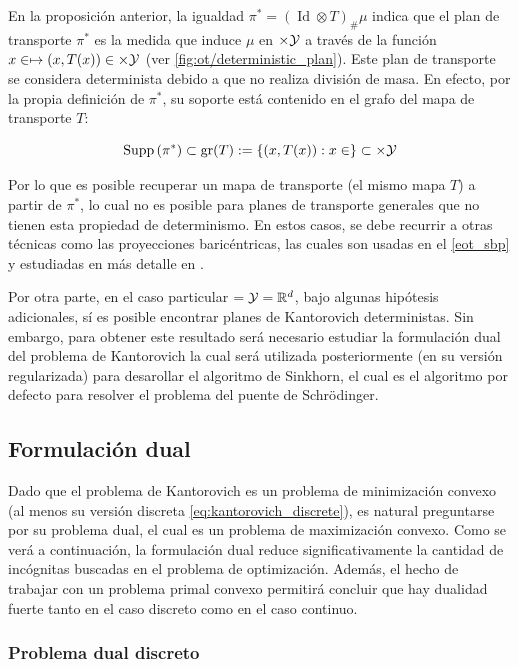 En la proposición anterior, la igualdad $\pi^* = (\operatorname{Id}\otimes T)_\#\mu$ indica que el plan de transporte $\pi^*$ es la medida que induce $\mu$ en $\times\mathcal{Y}$ a través de la función $x\in\mapsto (x,T(x))\in\times\mathcal{Y}$ (ver \autoref{fig:ot/deterministic_plan}). Este plan de transporte se considera determinista debido a que no realiza división de masa. En efecto, por la propia definición de $\pi^*$, su soporte está contenido en el grafo del mapa de transporte $T$:

\begin{equation*}
	\operatorname{Supp}\left(\pi^*\right)
	\subset \operatorname{gr}(T) := \{(x,T(x)) : x\in\}
	\subset \times\mathcal{Y}
\end{equation*}

Por lo que es posible recuperar un mapa de transporte (el mismo mapa $T$) a partir de $\pi^*$, lo cual no es posible para planes de transporte generales que no tienen esta propiedad de determinismo. En estos casos, se debe recurrir a otras técnicas como las proyecciones baricéntricas, las cuales son usadas en el \autoref{eot_sbp} y estudiadas en más detalle en \cite{peyré2020computational}.

Por otra parte, en el caso particular $=\mathcal{Y}=\mathbb{R}^d$, bajo algunas hipótesis adicionales, sí es posible encontrar planes de Kantorovich deterministas. Sin embargo, para obtener este resultado será necesario estudiar la formulación dual del problema de Kantorovich la cual será utilizada posteriormente (en su versión regularizada) para desarollar el algoritmo de Sinkhorn, el cual es el algoritmo por defecto para resolver el problema del puente de Schrödinger.

\subsection{Formulación dual}
\label{ot/kantorovich/dual}

Dado que el problema de Kantorovich es un problema de minimización convexo (al menos su versión discreta \eqref{eq:kantorovich_discrete}), es natural preguntarse por su problema dual, el cual es un problema de maximización convexo. Como se verá a continuación, la formulación dual reduce significativamente la cantidad de incógnitas buscadas en el problema de optimización. Además, el hecho de trabajar con un problema primal convexo permitirá concluir que hay dualidad fuerte tanto en el caso discreto como en el caso continuo.

\subsubsection{Problema dual discreto}

